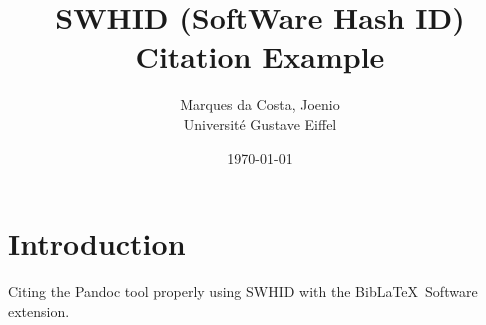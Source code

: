 \documentclass{article}
\title{
  SWHID (SoftWare Hash ID) Citation Example
}
\author{
  Marques da Costa, Joenio\\
  Université Gustave Eiffel
}
\date{\today}
\begin{document}
\maketitle

\section{Introduction}

Citing the Pandoc tool \cite{MacFarlane_Pandoc} properly using SWHID
with the Bib\LaTeX \ Software extension\cite{softwareheritageorg_citing_2020}.

\printbibliography
\end{document}

